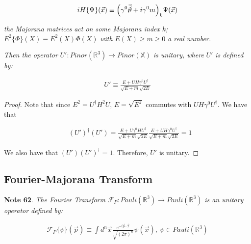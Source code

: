 \documentclass[11pt]{book}
\begin{document}
\begin{equation}\begin{aligned}
iH\{\Psi\}(\vec{x})\equiv
\Big(\gamma^0\vec{\cancel \partial}+i\gamma^0m\Big)_k\Psi(\vec{x})\end{aligned}\end{equation}

\emph{ the Majorana matrices act on some Majorana index }\(k\)\emph{;
}\(E^2\{\Phi\}(X)\equiv E^2(X)\Phi(X)\)\emph{ with
}\(E(X)\geq m\geq 0\)\emph{ a real number.}

\emph{Then the operator
}\(U':Pinor(\mathbb{R}^3)\to Pinor(\mathbb{X})\)\emph{ is unitary, where
}\(U'\)\emph{ is defined by: }

\begin{equation}\begin{aligned}
U'\equiv \frac{E+U H\gamma^0 U^\dagger}{\sqrt{E+m}\sqrt{2E}}\end{aligned}\end{equation}

\emph{Proof.} Note that since \(E^2=U^\dagger H^2 U\), \(E=\sqrt{E^2}\)
commutes with \(U H\gamma^0
U^\dagger\). We have that

\begin{equation}\begin{aligned}
&(U')^\dagger (U')=\frac{E+U\gamma^0 H U^\dagger}{\sqrt{E+m}\sqrt{2E}}
\frac{E+U H\gamma^0 U^\dagger}{\sqrt{E+m}\sqrt{2E}}=1\end{aligned}\end{equation}

We also have that \((U')(U')^\dagger=1\). Therefore, \(U'\) is
unitary.~◻

\hypertarget{fourier-majorana-transform}{%
\subsection{Fourier-Majorana
Transform}\label{fourier-majorana-transform}}

\textbf{Note 62}. \emph{The Fourier Transform
}\(\mathcal{F}_P: Pauli(\mathbb{R}^3)\to Pauli(\mathbb{R}^3)\)\emph{ is
an unitary operator defined by: }

\begin{equation}\begin{aligned}
\mathcal{F}_P\{\psi\}(\vec{p})\equiv\int d^n\vec{x} \frac{e^{-i\vec{p}\cdot
  \vec{x}}}{\sqrt{(2\pi)^n}}\psi(\vec{x}),\ \psi\in Pauli(\mathbb{R}^3)\end{aligned}\end{equation}
\end{document}

